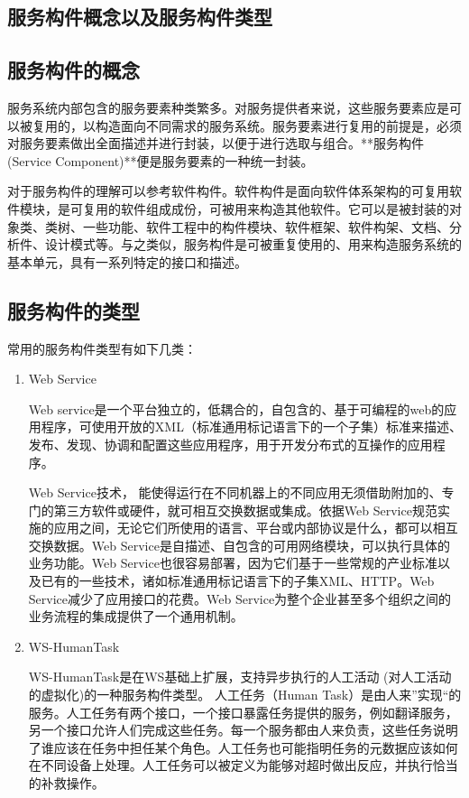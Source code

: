 \documentclass[11pt,a4paper]{article}
\begin{document}
\begin{CJK}{UTF8}{gbsn}
\section{服务构件概念以及服务构件类型}

\subsection{服务构件的概念}
 
服务系统内部包含的服务要素种类繁多。对服务提供者来说，这些服务要素应是可以被复用的，以构造面向不同需求的服务系统。服务要素进行复用的前提是，必须对服务要素做出全面描述并进行封装，以便于进行选取与组合。**服务构件(Service Component)**便是服务要素的一种统一封装。

对于服务构件的理解可以参考软件构件。软件构件是面向软件体系架构的可复用软件模块，是可复用的软件组成成份，可被用来构造其他软件。它可以是被封装的对象类、类树、一些功能、软件工程中的构件模块、软件框架、软件构架、文档、分析件、设计模式等。与之类似，服务构件是可被重复使用的、用来构造服务系统的基本单元，具有一系列特定的接口和描述。


\subsection{服务构件的类型}

常用的服务构件类型有如下几类：

\begin{enumerate}
\item Web Service 

    Web service是一个平台独立的，低耦合的，自包含的、基于可编程的web的应用程序，可使用开放的XML（标准通用标记语言下的一个子集）标准来描述、发布、发现、协调和配置这些应用程序，用于开发分布式的互操作的应用程序。
    
    Web Service技术， 能使得运行在不同机器上的不同应用无须借助附加的、专门的第三方软件或硬件，就可相互交换数据或集成。依据Web Service规范实施的应用之间，无论它们所使用的语言、平台或内部协议是什么，都可以相互交换数据。Web Service是自描述、自包含的可用网络模块，可以执行具体的业务功能。Web Service也很容易部署，因为它们基于一些常规的产业标准以及已有的一些技术，诸如标准通用标记语言下的子集XML、HTTP。Web Service减少了应用接口的花费。Web Service为整个企业甚至多个组织之间的业务流程的集成提供了一个通用机制。

\item WS-HumanTask

    WS-HumanTask是在WS基础上扩展，支持异步执行的人工活动 (对人工活动的虚拟化)的一种服务构件类型。
    人工任务（Human Task）是由人来”实现“的服务。人工任务有两个接口，一个接口暴露任务提供的服务，例如翻译服务，另一个接口允许人们完成这些任务。每一个服务都由人来负责，这些任务说明了谁应该在任务中担任某个角色。人工任务也可能指明任务的元数据应该如何在不同设备上处理。人工任务可以被定义为能够对超时做出反应，并执行恰当的补救操作。
    

\end{enumerate}
\end{CJK}
\end{document}
